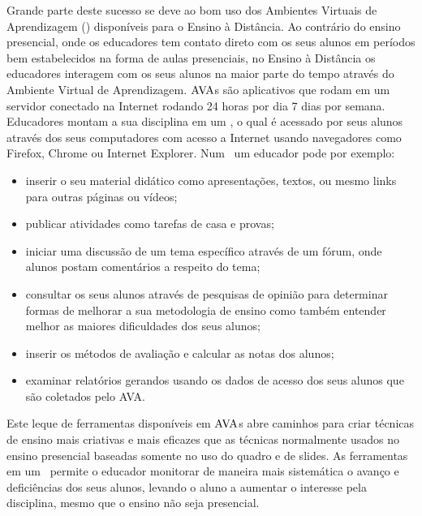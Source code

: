  

Grande parte deste sucesso se deve ao bom uso dos Ambientes Virtuais de Aprendizagem (\ava) disponíveis para
o Ensino à Distância. Ao contrário do ensino presencial, onde os educadores tem contato direto 
com os seus alunos em períodos bem estabelecidos na forma de aulas presenciais, 
no Ensino à Distância os educadores interagem com os seus alunos na maior parte do tempo 
através do Ambiente Virtual de Aprendizagem. $\hbox{AVA}$s são aplicativos que rodam em um servidor 
conectado na Internet rodando 24 horas por dia 7 dias por semana. Educadores montam a sua disciplina em um \ava, o qual é acessado 
por seus alunos através dos seus computadores com acesso a Internet usando navegadores como Firefox, Chrome ou Internet Explorer. 
Num \ava\ um educador pode por exemplo:
\begin{itemize}
 \item inserir o seu material didático como apresentações, textos, ou mesmo links para outras páginas ou vídeos;
 \item publicar atividades como tarefas de casa e provas;
 \item iniciar uma discussão de um tema específico através de um fórum, onde alunos postam comentários a 
 respeito do tema;
 \item consultar os seus alunos através de pesquisas de opinião para determinar
formas de melhorar a sua metodologia de ensino como também entender melhor as
maiores dificuldades dos seus alunos;
 \item inserir os métodos de avaliação e calcular as notas dos alunos;
 \item examinar relatórios gerandos usando os dados de acesso dos seus alunos que são 
coletados pelo AVA.
\end{itemize}
Este leque de ferramentas disponíveis em $\hbox{AVA}$s abre caminhos para criar técnicas de ensino 
mais criativas e mais eficazes que as técnicas normalmente usados no ensino presencial
baseadas somente no uso do quadro e de slides. As ferramentas em um \ava\ permite  
o educador monitorar de maneira mais sistemática o avanço e deficiências dos seus alunos, 
levando o aluno a aumentar o interesse pela disciplina, mesmo que o ensino não seja presencial. 

